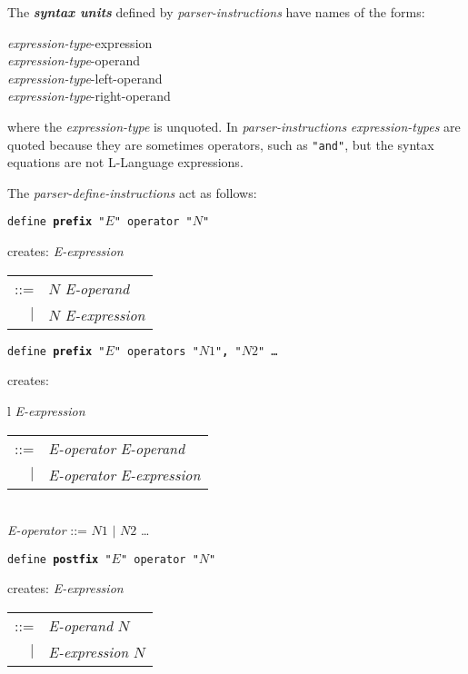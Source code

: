 \documentclass[12pt]{article}
\newcommand{\TT}[1]{{\tt \bfseries #1}}
\newcommand{\skey}[2]{{\bf \em #1#2}\index{#1}}
\newenvironment{indpar}[1][0.3in]%
	{\begin{list}{}%
		     {\setlength{\itemsep}{0in}%
		      \setlength{\topsep}{0in}%
		      \setlength{\parsep}{1ex}%
		      \setlength{\labelwidth}{#1}%
		      \setlength{\leftmargin}{#1}%
		      \addtolength{\leftmargin}{\labelsep}}%
	 \item}%
	{\end{list}}
\begin{document}
The \skey{syntax unit}s defined by {\em parser-instructions}
have names of the forms:
\begin{center}
{\em expression-type}-expression \\
{\em expression-type}-operand \\
{\em expression-type}-left-operand \\
{\em expression-type}-right-operand \\
\end{center}
where the {\em expression-type} is unquoted.  In {\em parser-instructions}
{\em expression-types} are quoted because they are sometimes operators,
such as {\tt "and"}, but the syntax equations are not L-Language expressions.

The {\em parser-define-instructions} act as follows:

\begin{indpar}

{\tt define \TT{prefix} "$E$" operator "$N$"}
\begin{indpar}
creates: {\em E-expression} \begin{tabular}[t]{rl}
                            ::= & $N$ {\em E-operand} \\
                            $|$ & $N$ {\em E-expression} \\
                            \end{tabular}
\end{indpar}

{\tt define \TT{prefix} "$E$" operators "$N1$"\TT{,} "$N2$" \ldots}
\begin{indpar}
creates: \begin{tabular}[t]{l}
         {\em E-expression} \begin{tabular}[t]{rl}
                            ::= & {\em E-operator} {\em E-operand} \\
                            $|$ & {\em E-operator} {\em E-expression} \\
                            \end{tabular} \\
         {\em E-operator} ::= $N1$ $|$ $N2$ \ldots \\
	 \end{tabular}
\end{indpar}

{\tt define \TT{postfix} "$E$" operator "$N$"}
\begin{indpar}
creates: {\em E-expression} \begin{tabular}[t]{rl}
                            ::= & {\em E-operand} $N$ \\
                            $|$ & {\em E-expression} $N$ \\
                            \end{tabular}
\end{indpar}


\end{indpar}
\end{document}
